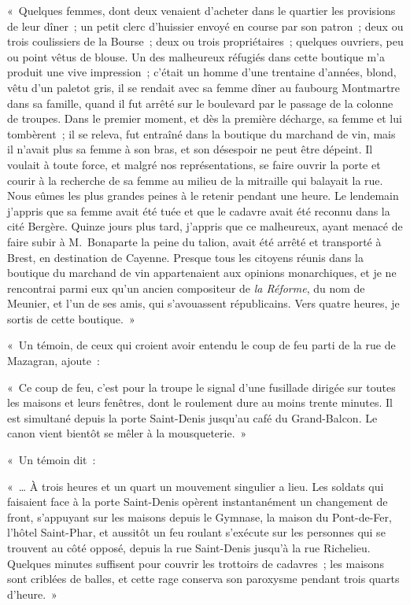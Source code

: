 \documentclass[french,twoside]{book} %
\newenvironment{quoteblock}%
  {\begin{quoting}}
  {\end{quoting}}
\newenvironment{quotebar}{%
    \def\FrameCommand{{\color{rubric!10!}\vrule width 0.5em} \hspace{0.9em}}%
    \def\OuterFrameSep{\itemsep} %
    \MakeFramed {\advance\hsize-\width \FrameRestore}
  }%
  {%
    \endMakeFramed
  }
\renewenvironment{quoteblock}%
  {%
    \savenotes
    \setstretch{0.9}
    \normalfont
    \begin{quotebar}
  }
  {%
    \end{quotebar}
    \spewnotes
  }
\begin{document}
« Quelques femmes, dont deux venaient d’acheter dans le quartier les provisions de leur dîner ; un petit clerc d’huissier envoyé en course par son patron ; deux ou trois coulissiers de la Bourse ; deux ou trois propriétaires ; quelques ouvriers, peu ou point vêtus de blouse. Un des malheureux réfugiés dans cette boutique m’a produit une vive impression ; c’était un homme d’une trentaine d’années, blond, vêtu d’un paletot gris, il se rendait avec sa femme dîner au faubourg Montmartre dans sa famille, quand il fut arrêté sur le boulevard par le passage de la colonne de troupes. Dans le premier moment, et dès la première décharge, sa femme et lui tombèrent ; il se releva, fut entraîné dans la boutique du marchand de vin, mais il n’avait plus sa femme à son bras, et son désespoir ne peut être dépeint. Il voulait à toute force, et malgré nos représentations, se faire ouvrir la porte et courir à la recherche de sa femme au milieu de la mitraille qui balayait la rue. Nous eûmes les plus grandes peines à le retenir pendant une heure. Le lendemain j’appris que sa femme avait été tuée et que le cadavre avait été reconnu dans la cité Bergère. Quinze jours plus tard, j’appris que ce malheureux, ayant menacé de faire subir à M. Bonaparte la peine du talion, avait été arrêté et transporté à Brest, en destination de Cayenne. Presque tous les citoyens réunis dans la boutique du marchand de vin appartenaient aux opinions monarchiques, et je ne rencontrai parmi eux qu’un ancien compositeur de \emph{la Réforme}, du nom de Meunier, et l’un de ses amis, qui s’avouassent républicains. Vers quatre heures, je sortis de cette boutique. »\par
« Un témoin, de ceux qui croient avoir entendu le coup de feu parti de la rue de Mazagran, ajoute :\par

\begin{quoteblock}
 \noindent « Ce coup de feu, c’est pour la troupe le signal d’une fusillade dirigée sur toutes les maisons et leurs fenêtres, dont le roulement dure au moins trente minutes. Il est simultané depuis la porte Saint-Denis jusqu’au café du Grand-Balcon. Le canon vient bientôt se mêler à la mousqueterie. »
 \end{quoteblock}

\noindent « Un témoin dit :\par

\begin{quoteblock}
 \noindent « … À trois heures et un quart un mouvement singulier a lieu. Les soldats qui faisaient face à la porte Saint-Denis opèrent instantanément un changement de front, s’appuyant sur les maisons depuis le Gymnase, la maison du Pont-de-Fer, l’hôtel Saint-Phar, et aussitôt un feu roulant s’exécute sur les personnes qui se trouvent au côté opposé, depuis la rue Saint-Denis jusqu’à la rue Richelieu. Quelques minutes suffisent pour couvrir les trottoirs de cadavres ; les maisons sont criblées de balles, et cette rage conserva son paroxysme pendant trois quarts d’heure. »
 \end{quoteblock}
\end{document}
